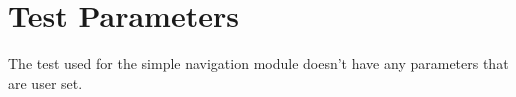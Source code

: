 \section{Test Parameters}

The test used for the simple navigation module doesn't have any parameters that are user set. 